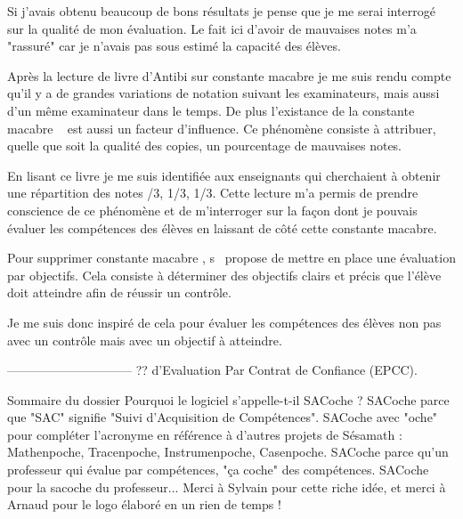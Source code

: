 Si j'avais obtenu beaucoup de bons résultats je pense que je me serai interrogé sur la qualité de mon évaluation.
Le fait ici d'avoir de mauvaises notes m'a "rassuré" car je n'avais pas sous estimé la capacité des élèves.

Après la lecture de livre d'Antibi sur \og constante macabre \fg je me suis rendu compte qu'il y a de grandes variations de notation suivant les examinateurs, mais aussi d'un même examinateur dans le temps.
De plus l'existance de la \og constante macabre \fg~\cite{antibi2003constante} est aussi un facteur d'influence.
Ce phénomène consiste à attribuer, quelle que soit la qualité des copies, un pourcentage de mauvaises notes.

En lisant ce livre je me suis identifiée aux enseignants qui cherchaient à obtenir une répartition des notes /3, 1/3, 1/3\fg.
Cette lecture m'a permis de prendre conscience de ce phénomène et de m'interroger sur la façon dont je pouvais évaluer les compétences des élèves en laissant de côté cette constante macabre.

Pour supprimer \og constante macabre \fg, s~\cite{antibi2007notes} propose de mettre en place une évaluation par objectifs.
Cela consiste à déterminer des objectifs clairs et précis que l'élève doit atteindre afin de réussir un contrôle.

Je me suis donc inspiré de cela pour évaluer les compétences des élèves non pas avec un contrôle mais avec un objectif à atteindre.

------------------------------
??
d’Evaluation Par Contrat de Confiance (EPCC).


 Sommaire du dossier
Pourquoi le logiciel s'appelle-t-il SACoche ?
SACoche parce que "SAC" signifie "Suivi d'Acquisition de Compétences".
SACoche avec "oche" pour compléter l'acronyme en référence à d'autres projets de Sésamath : Mathenpoche, Tracenpoche, Instrumenpoche, Casenpoche.
SACoche parce qu'un professeur qui évalue par compétences, "ça coche" des compétences.
SACoche pour la sacoche du professeur...
Merci à Sylvain pour cette riche idée, et merci à Arnaud pour le logo élaboré en un rien de temps ! 

